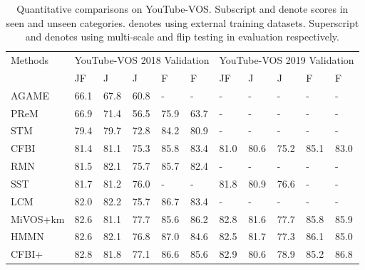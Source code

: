 \documentclass[letterpaper]{article} \usepackage{aaai22}  \usepackage{times}  \usepackage{helvet}  \usepackage{courier}  \usepackage[hyphens]{url}  \usepackage{graphicx} \urlstyle{rm} \def\UrlFont{\rm}  \usepackage{natbib}  \usepackage{caption} \DeclareCaptionStyle{ruled}{labelfont=normalfont,labelsep=colon,strut=off} \frenchspacing  \setlength{\pdfpagewidth}{8.5in}  \setlength{\pdfpageheight}{11in}  \usepackage{algorithm}
\begin{document}
\begin{table*}[ht]
\caption{Quantitative comparisons on YouTube-VOS. Subscript  and  denote scores in seen and unseen categories.  denotes using external training datasets. Superscript  and  denotes using multi-scale and flip testing in evaluation respectively. } 
\centering
\setlength{\tabcolsep}{3.5mm}
\resizebox{\textwidth}{!}
    {

	\begin{tabular}{llllll|lllll}\toprule
		\multirow{2}{*}{Methods} &\multicolumn{5}{c}{YouTube-VOS 2018 Validation}  & \multicolumn{5}{c}{YouTube-VOS 2019 Validation}                                    \\
		\cmidrule(l){2-11}
		 & JF & J & J & F & F & JF & J & J & F & F\\
 \midrule 
		AGAME {\cite{johnander2019generative}}&      66.1 & 67.8 & 60.8 & -     & -   & -     & -& -    &-&- \\
		PReM {\cite{luiten2018premvos}}&    66.9 & 71.4 & 56.5 & 75.9  & 63.7 & -     & -& -     & -  & -   \\
		
		
		STM {\cite{oh2019video}}&      79.4 & 79.7 & 72.8 & 84.2  & 80.9 & -     & -& -     & -  & -   \\
		CFBI {\cite{yang2020collaborative}}&    81.4 & 81.1 & 75.3 & 85.8  & 83.4  &81.0 & 80.6 & 75.2 & 85.1  & 83.0\\		
		RMN {\cite{xie2021efficient}}&         81.5&82.1&75.7& 85.7&82.4 & -     & -& -     & -  & -    \\
		SST {\cite{duke2021sstvos}}&       81.7&81.2&76.0& -&-  & 81.8&80.9&76.6     & -  & -    \\
		LCM {\cite{hu2021learning}}&  82.0&82.2&75.7& {86.7}&83.4 & -     & -& -     & -    & -  \\	
		MiVOS+km {\cite{cheng2021modular}}&  82.6 & 81.1 &77.7&85.6&86.2 &  82.8 & 81.6 &77.7&85.8&85.9       \\
        HMMN{\cite{seong2021hierarchical}}&   82.6 & 82.1& 76.8&87.0&84.6 & 82.5 & 81.7 &77.3&86.1&85.0     \\
		CFBI+ {\cite{yang2021collaborative}}&   82.8 & 81.8 &77.1&86.6&85.6 & 82.9 & 80.6 &78.9&85.2&86.8     \\
		


\end{tabular}}
\end{table*}
\end{document}
